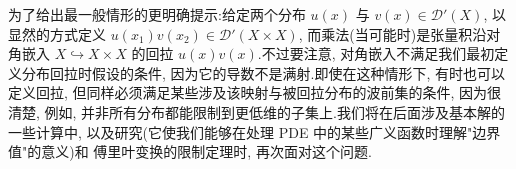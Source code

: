 为了给出最一般情形的更明确提示:给定两个分布 $u(x)$ 与 $v(x)\in\mathcal{D}'(X)$, 以显然的方式定义 $u(x_1)v(x_2)\in\mathcal{D}'(X\times X)$, 而乘法(当可能时)是张量积沿对角嵌入 $X\hookrightarrow X\times X$ 的回拉 $u(x)v(x)$.不过要注意, 对角嵌入不满足我们最初定义分布回拉时假设的条件, 因为它的导数不是满射.即使在这种情形下, 有时也可以定义回拉, 但同样必须满足某些涉及该映射与被回拉分布的波前集的条件, 因为很清楚, 例如, 并非所有分布都能限制到更低维的子集上.我们将在后面涉及基本解的一些计算中, 以及研究(它使我们能够在处理 PDE 中的某些广义函数时理解"边界值"的意义)和 傅里叶变换的限制定理时, 再次面对这个问题.
